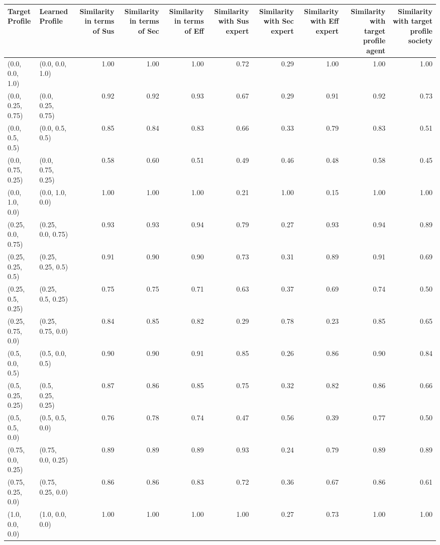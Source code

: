 \begin{tabular}{llrrrrrrrr}
\toprule
Target Profile & Learned Profile & Similarity in terms of Sus & Similarity in terms of Sec & Similarity in terms of Eff & Similarity with Sus expert & Similarity with Sec expert & Similarity with Eff expert & Similarity with target profile agent & Similarity with target profile society \\
\midrule
(0.0, 0.0, 1.0) & (0.0, 0.0, 1.0) & 1.00 & 1.00 & 1.00 & 0.72 & 0.29 & 1.00 & 1.00 & 1.00 \\
(0.0, 0.25, 0.75) & (0.0, 0.25, 0.75) & 0.92 & 0.92 & 0.93 & 0.67 & 0.29 & 0.91 & 0.92 & 0.73 \\
(0.0, 0.5, 0.5) & (0.0, 0.5, 0.5) & 0.85 & 0.84 & 0.83 & 0.66 & 0.33 & 0.79 & 0.83 & 0.51 \\
(0.0, 0.75, 0.25) & (0.0, 0.75, 0.25) & 0.58 & 0.60 & 0.51 & 0.49 & 0.46 & 0.48 & 0.58 & 0.45 \\
(0.0, 1.0, 0.0) & (0.0, 1.0, 0.0) & 1.00 & 1.00 & 1.00 & 0.21 & 1.00 & 0.15 & 1.00 & 1.00 \\
(0.25, 0.0, 0.75) & (0.25, 0.0, 0.75) & 0.93 & 0.93 & 0.94 & 0.79 & 0.27 & 0.93 & 0.94 & 0.89 \\
(0.25, 0.25, 0.5) & (0.25, 0.25, 0.5) & 0.91 & 0.90 & 0.90 & 0.73 & 0.31 & 0.89 & 0.91 & 0.69 \\
(0.25, 0.5, 0.25) & (0.25, 0.5, 0.25) & 0.75 & 0.75 & 0.71 & 0.63 & 0.37 & 0.69 & 0.74 & 0.50 \\
(0.25, 0.75, 0.0) & (0.25, 0.75, 0.0) & 0.84 & 0.85 & 0.82 & 0.29 & 0.78 & 0.23 & 0.85 & 0.65 \\
(0.5, 0.0, 0.5) & (0.5, 0.0, 0.5) & 0.90 & 0.90 & 0.91 & 0.85 & 0.26 & 0.86 & 0.90 & 0.84 \\
(0.5, 0.25, 0.25) & (0.5, 0.25, 0.25) & 0.87 & 0.86 & 0.85 & 0.75 & 0.32 & 0.82 & 0.86 & 0.66 \\
(0.5, 0.5, 0.0) & (0.5, 0.5, 0.0) & 0.76 & 0.78 & 0.74 & 0.47 & 0.56 & 0.39 & 0.77 & 0.50 \\
(0.75, 0.0, 0.25) & (0.75, 0.0, 0.25) & 0.89 & 0.89 & 0.89 & 0.93 & 0.24 & 0.79 & 0.89 & 0.89 \\
(0.75, 0.25, 0.0) & (0.75, 0.25, 0.0) & 0.86 & 0.86 & 0.83 & 0.72 & 0.36 & 0.67 & 0.86 & 0.61 \\
(1.0, 0.0, 0.0) & (1.0, 0.0, 0.0) & 1.00 & 1.00 & 1.00 & 1.00 & 0.27 & 0.73 & 1.00 & 1.00 \\
\bottomrule
\end{tabular}

